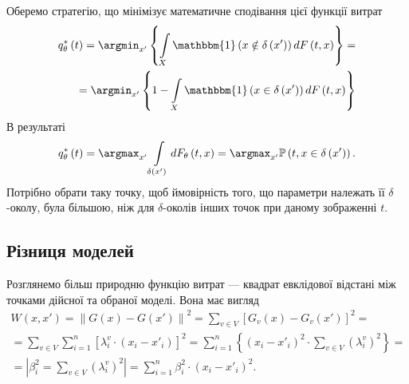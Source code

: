 Оберемо стратегію, що мінімізує математичне сподівання цієї функції витрат
\begin{equation*}
  \begin{split}
    q^*_{\theta}\left( t \right)
    = \argmin_{x'} \left\{
      \int\limits_{X}
        \mathbbm{1} \left( x \notin \delta\left( x' \right) \right)
        d F\left( t, x \right)
      \right\} = \\
    = \argmin_{x'} \left\{
      1 -
      \int\limits_{X}
        \mathbbm{1} \left( x \in \delta\left( x' \right) \right)
        d F\left( t, x \right)
      \right\}
  \end{split}
\end{equation*}
В результаті
\begin{equation*}
  q^*_{\theta}\left( t \right)
  = \argmax_{x'} \int\limits_{\delta\left( x' \right)}
    dF_{\theta}\left( t, x \right)
  = \argmax_{x'} \mathbb{P} \left( t, x \in \delta\left( x' \right) \right).
\end{equation*}
Потрібно обрати таку точку,
щоб ймовірність того,
що параметри належать її $\delta$-околу,
була більшою,
ніж для $\delta$-околів інших точок при даному зображенні $t$.

\subsection{Різниця моделей}

Розглянемо більш природню функцію витрат ---
квадрат евклідової відстані між точками дійсної та обраної моделі.
Вона має вигляд
\begin{equation*}
  \begin{split}
    W \left( x, x' \right)
    = \left\| G\left( x \right) - G\left( x' \right) \right\|^2
    = \sum_{v \in V} \left[
        G_v\left( x \right) - G_v\left( x' \right)
      \right]^2 = \\
    = \sum_{v \in V} \sum_{i = 1}^n \left[
        \lambda_i^v \cdot \left( x_i - x'_i \right)
      \right]^2
    = \sum_{i = 1}^n \left\{ \left( x_i - x'_i \right)^2
      \cdot \sum_{v \in V} \left( \lambda_i^v \right)^2 \right\} = \\
    = \left| \beta_i^2 = \sum_{v \in V} \left( \lambda_i^v \right)^2 \right|
    = \sum_{i = 1}^n \beta_i^2 \cdot \left( x_i - x'_i \right)^2.
  \end{split}
\end{equation*}

